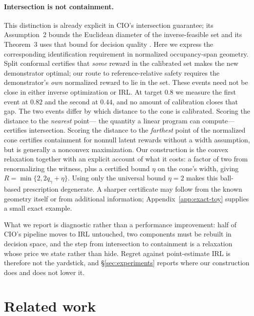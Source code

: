 \documentclass{article}
\begin{document}
\paragraph{Intersection is not containment.} This distinction is already
explicit in CIO's intersection guarantee; its Assumption~2 bounds the
Euclidean diameter of the inverse-feasible set and its Theorem~3 uses that
bound for decision quality \citep{lin2024conformal}. Here we express the
corresponding identification requirement in normalized occupancy-span geometry.
Split conformal certifies that \emph{some} reward in the calibrated set makes the new
demonstrator optimal; our route to reference-relative safety requires the
demonstrator's \emph{own} normalized reward to lie in the set. These events need
not be close in either inverse optimization or IRL. At
target $0.8$ we measure the first event at $0.82$ and the second at $0.44$, and
no amount of calibration closes that gap. The two events differ by which
distance to the cone is calibrated. Scoring the distance to the \emph{nearest} point---%
the quantity a linear program can compute---certifies intersection. Scoring the
distance to the \emph{farthest} point of the normalized cone certifies
containment for nonnull latent rewards without a width assumption, but is
generally a nonconvex maximization. Our
construction is the convex relaxation together with an explicit account of what
it costs: a factor of two from renormalizing the witness, plus a certified
bound $\eta$ on the cone's width, giving $R=\min\{2,2q_\gamma+\eta\}$. Using
only the universal bound $\eta=2$ makes this ball-based prescription degenerate.
A sharper certificate may follow from the known geometry itself or from
additional information; Appendix~\ref{app:exact-toy} supplies a small exact example.

What we report is diagnostic rather than a performance improvement: half of
CIO's pipeline moves to IRL untouched, two components must be rebuilt in
decision space, and the step from intersection to containment is a relaxation
whose price we state rather than hide. Regret
against point-estimate IRL is therefore not the yardstick, and
\S\ref{sec:experiments} reports where our construction does and does not lower
it.

\section{Related work}
\label{sec:related}
\end{document}
